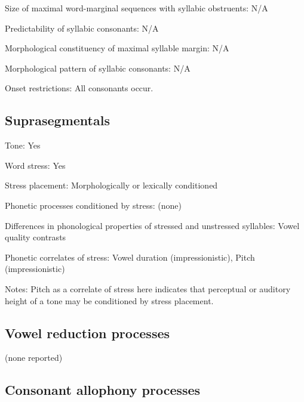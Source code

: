 {\begin{appendixdesc}
\item[Size of maximal word-marginal sequences with syllabic obstruents:] N/A

\item[Predictability of syllabic consonants:] N/A

\item[Morphological constituency of maximal syllable margin:] N/A

\item[Morphological pattern of syllabic consonants:] N/A

\item[Onset restrictions:] All consonants occur.
\end{appendixdesc}
\subsection*{Suprasegmentals}
\begin{appendixdesc}
\item[Tone:] Yes

\item[Word stress:] Yes

\item[Stress placement:] Morphologically or lexically conditioned

\item[Phonetic processes conditioned by stress:] (none)

\item[Differences in phonological properties of stressed and unstressed syllables:] Vowel quality contrasts

\item[Phonetic correlates of stress:] Vowel duration (impressionistic), Pitch (impressionistic)

\item[Notes:] Pitch as a correlate of stress here indicates that perceptual or auditory height of a tone may be conditioned by stress placement.
\end{appendixdesc}
\subsection*{Vowel reduction processes}

(none reported)

\subsection*{Consonant allophony processes}
\begin{appendixdesc}


\end{appendixdesc}}
